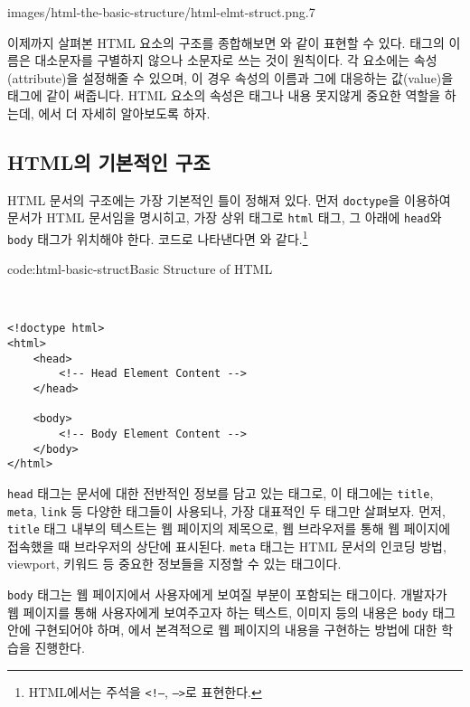     {images/html-the-basic-structure/html-elmt-struct.png}{.7}

이제까지 살펴본 HTML 요소의 구조를 종합해보면 와 같이 표현할 수 있다. 태그의 이름은 대소문자를 구별하지 않으나 소문자로 쓰는 것이 원칙이다. 각 요소에는 속성(attribute)을 설정해줄 수 있으며, 이 경우 속성의 이름과 그에 대응하는 값(value)을 태그에 같이 써줍니다. HTML 요소의 속성은 태그나 내용 못지않게 중요한 역할을 하는데, 에서 더 자세히 알아보도록 하자.

\subsection*{HTML의 기본적인 구조}
HTML 문서의 구조에는 가장 기본적인 틀이 정해져 있다. 먼저 \verb|doctype|을 이용하여 문서가 HTML 문서임을 명시히고, 가장 상위 태그로 \verb|html| 태그, 그 아래에 \verb|head|와 \verb|body| 태그가 위치해야 한다. 코드로 나타낸다면 와 같다.\footnote{HTML에서는 주석을 \texttt{<!--}, \texttt{-->}로 표현한다.}

\begin{codeenv}{code:html-basic-struct}{Basic Structure of HTML}
\begin{verbatim}


<!doctype html>
<html>
    <head>
        <!-- Head Element Content -->
    </head>

    <body>
        <!-- Body Element Content -->
    </body>
</html>
\end{verbatim}
\end{codeenv}

\verb|head| 태그는 문서에 대한 전반적인 정보를 담고 있는 태그로, 이 태그에는 \verb|title|, \verb|meta|, \verb|link| 등 다양한 태그들이 사용되나, 가장 대표적인 두 태그만 살펴보자. 먼저, \verb|title| 태그 내부의 텍스트는 웹 페이지의 제목으로, 웹 브라우저를 통해 웹 페이지에 접속했을 때 브라우저의 상단에 표시된다. \verb|meta| 태그는 HTML 문서의 인코딩 방법, viewport, 키워드 등 중요한 정보들을 지정할 수 있는 태그이다. 

\verb|body| 태그는 웹 페이지에서 사용자에게 보여질 부분이 포함되는 태그이다. 개발자가 웹 페이지를 통해 사용자에게 보여주고자 하는 텍스트, 이미지 등의 내용은 \verb|body| 태그 안에 구현되어야 하며, 에서 본격적으로 웹 페이지의 내용을 구현하는 방법에 대한 학습을 진행한다.
